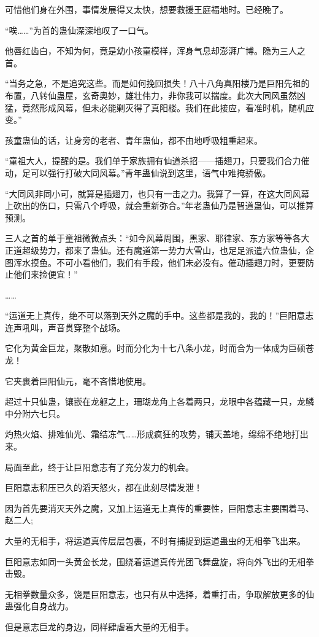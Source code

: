 \begin{this_body}
可惜他们身在外围，事情发展得又太快，想要救援王庭福地时。已经晚了。

“唉……”为首的蛊仙深深地叹了一口气。

他唇红齿白，不知为何，竟是幼小孩童模样，浑身气息却澎湃广博。隐为三人之首。

“当务之急，不是追究这些。而是如何挽回损失！八十八角真阳楼乃是巨阳先祖的布置，八转仙蛊屋，玄奇奥妙，雄壮伟力，非你我可以揣度。此次大同风虽然凶猛，竟然形成风幕，但未必能剿灭得了真阳楼。我们在此接应，看准时机，随机应变。”

孩童蛊仙的话，让身旁的老者、青年蛊仙，都不由地呼吸粗重起来。

“童祖大人，提醒的是。我们单于家族拥有仙道杀招——插翅刀，只要我们合力催动，足可以强行打破大同风幕。”青年蛊仙说到这里，语气中难掩骄傲。

“大同风非同小可，就算是插翅刀，也只有一击之力。我算了一算，在这大同风幕上砍出的伤口，只需八个呼吸，就会重新弥合。”年老蛊仙乃是智道蛊仙，可以推算预测。

三人之首的单于童祖微微点头：“如今风幕周围，黑家、耶律家、东方家等等各大正道超级势力，都来了蛊仙。还有魔道第一势力大雪山，也足足派遣六位蛊仙，企图浑水摸鱼。不可小看他们，我们有手段，他们未必没有。催动插翅刀时，更要防止他们来捡便宜！”

……

“运道无上真传，绝不可以落到天外之魔的手中。这些都是我的，我的！”巨阳意志连声吼叫，声音贯穿整个战场。

它化为黄金巨龙，聚散如意。时而分化为十七八条小龙，时而合为一体成为巨硕苍龙！

它夹裹着巨阳仙元，毫不吝惜地使用。

超过十只仙蛊，镶嵌在龙躯之上，珊瑚龙角上各着两只，龙眼中各蕴藏一只，龙鳞中分附六七只。

灼热火焰、排难仙光、霜结冻气……形成疯狂的攻势，铺天盖地，绵绵不绝地打出来。

局面至此，终于让巨阳意志有了充分发力的机会。

巨阳意志积压已久的滔天怒火，都在此刻尽情发泄！

因为首先要消灭天外之魔，又加上运道无上真传的重要性，巨阳意志主要围着马、赵二人;

大量的无相手，将运道真传层层包裹，不时有捕捉到运道蛊虫的无相拳飞出来。

巨阳意志如同一头黄金长龙，围绕着运道真传光团飞舞盘旋，将向外飞出的无相拳击毁。

无相拳数量众多，饶是巨阳意志，也只有从中选择，着重打击，争取解放更多的仙蛊强化自身战力。

但是意志巨龙的身边，同样肆虐着大量的无相手。


\end{this_body}
